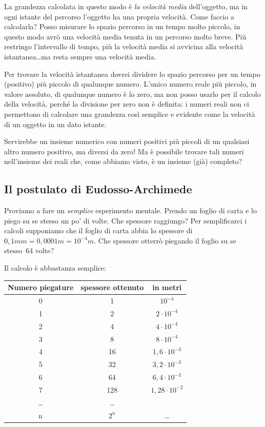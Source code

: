 La grandezza calcolata in questo modo è \emph{la velocità media} 
dell'oggetto, 
ma in ogni istante del percorso l'oggetto ha una propria velocità. Come 
faccio 
a calcolarla? Posso misurare lo spazio percorso in un tempo molto piccolo, 
in questo modo avrò una velocità media tenuta in un percorso molto breve. 
Più restringo l'intervallo di tempo, più la velocità media si avvicina alla 
velocità istantanea\dots ma resta sempre una velocità media. 

Per trovare la velocità istantanea dovrei dividere lo spazio percorso per 
un 
tempo (positivo) più piccolo di qualunque numero. L'unico numero reale
più piccolo, in valore assoluto, di qualunque numero è lo zero, ma 
non posso usarlo per il calcolo della velocità, perché la divisione per 
zero non è definita: i numeri reali non ci permettono di calcolare una 
grandezza così semplice e evidente come la velocità di un oggetto in un 
dato 
istante.

Servirebbe un insieme numerico con numeri positivi più piccoli di un 
qualsiasi altro numero positivo, ma diversi da zero! Ma è possibile 
trovare tali numeri nell'insieme dei reali che, come abbiamo visto, 
è un insieme (già) completo?

\subsection{Il postulato di Eudosso-Archimede}
\label{subsec:insnum_eudossoarchimede}

Proviamo a fare un \emph{semplice} esperimento mentale. Prendo un foglio di 
carta e lo piego su se stesso un po' di volte. Che spessore raggiungo?
Per semplificarci i calcoli supponiamo che il foglio di carta abbia lo 
spessore 
di $0,1mm = 0,0001m = 10^{-4}m$. 
Che spessore otterrò piegando il foglio su se stesso~64 volte?

Il calcolo è abbastanza semplice:

\begin{center}
 \begin{tabular}{ccc}
\toprule
Numero piegature & spessore ottenuto & in metri\\
\midrule
0 & 1 & $10^{-4}$\\
1 & 2 & $2 \cdot 10^{-4}$\\
2 & 4 & $4 \cdot 10^{-4}$\\
3 & 8 & $8 \cdot 10^{-4}$\\
4 & 16 & $1,6 \cdot 10^{-3}$\\
5 & 32 & $3,2 \cdot 10^{-3}$\\
6 & 64 & $6,4 \cdot 10^{-3}$\\
7 & 128 & $1,28 \cdot 10^{-2}$\\
\ldots& \ldots\\
n & $2^n$ & \ldots\\
\bottomrule
\end{tabular}
\end{center}

